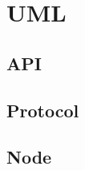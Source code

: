 \section{UML}
\subsection{API}
\label{uml-api}

\newpage
\subsection{Protocol}
\label{uml-protocol}

\newpage
\subsection{Node}
\label{uml-node}
